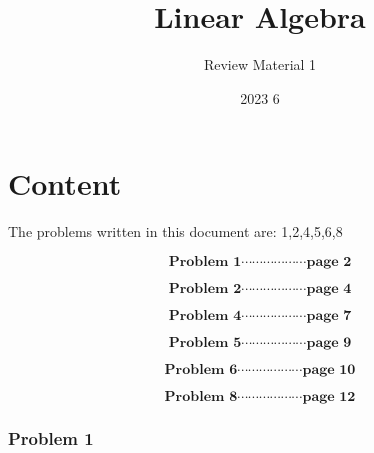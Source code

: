 \documentclass[12pt]{article}
\title{Linear Algebra}
\author{Review Material 1}
\date{2023 6}
\begin{document}
\part*{Content}

\vspace*{0.3cm}
The problems written in this document are: 1,2,4,5,6,8

\vspace*{4cm}

\[ \textbf{Problem 1} \cdots\cdots\cdots\cdots\cdots\cdots\textbf{page 2} \]

\[ \textbf{Problem 2} \cdots\cdots\cdots\cdots\cdots\cdots\textbf{page 4} \]

\[ \textbf{Problem 4} \cdots\cdots\cdots\cdots\cdots\cdots\textbf{page 7} \]

\[ \textbf{Problem 5} \cdots\cdots\cdots\cdots\cdots\cdots\textbf{page 9} \]

\[ \textbf{Problem 6} \cdots\cdots\cdots\cdots\cdots\cdots\textbf{page 10} \]

\[ \textbf{Problem 8} \cdots\cdots\cdots\cdots\cdots\cdots\textbf{page 12} \]

\newpage
\section*{Problem 1}
\end{document}
